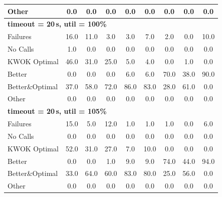 \begin{tabular}{l cccccccc}
Other & 0.0 & 0.0 & 0.0 & 0.0 & 0.0 & 0.0 & 0.0 & 0.0 \\
\midrule
\multicolumn{9}{l}{\textbf{timeout = 20\,s, util = 100\%}} \\
\midrule
Failures & 16.0 & 11.0 & 3.0 & 3.0 & 7.0 & 2.0 & 0.0 & 10.0 \\
No Calls & 1.0 & 0.0 & 0.0 & 0.0 & 0.0 & 0.0 & 0.0 & 0.0 \\
KWOK Optimal & 46.0 & 31.0 & 25.0 & 5.0 & 4.0 & 0.0 & 1.0 & 0.0 \\
Better & 0.0 & 0.0 & 0.0 & 6.0 & 6.0 & 70.0 & 38.0 & 90.0 \\
Better\&Optimal & 37.0 & 58.0 & 72.0 & 86.0 & 83.0 & 28.0 & 61.0 & 0.0 \\
Other & 0.0 & 0.0 & 0.0 & 0.0 & 0.0 & 0.0 & 0.0 & 0.0 \\
\midrule
\multicolumn{9}{l}{\textbf{timeout = 20\,s, util = 105\%}} \\
\midrule
Failures & 15.0 & 5.0 & 12.0 & 1.0 & 1.0 & 1.0 & 0.0 & 6.0 \\
No Calls & 0.0 & 0.0 & 0.0 & 0.0 & 0.0 & 0.0 & 0.0 & 0.0 \\
KWOK Optimal & 52.0 & 31.0 & 27.0 & 7.0 & 10.0 & 0.0 & 0.0 & 0.0 \\
Better & 0.0 & 0.0 & 1.0 & 9.0 & 9.0 & 74.0 & 44.0 & 94.0 \\
Better\&Optimal & 33.0 & 64.0 & 60.0 & 83.0 & 80.0 & 25.0 & 56.0 & 0.0 \\
Other & 0.0 & 0.0 & 0.0 & 0.0 & 0.0 & 0.0 & 0.0 & 0.0 \\
\bottomrule
\end{tabular}
